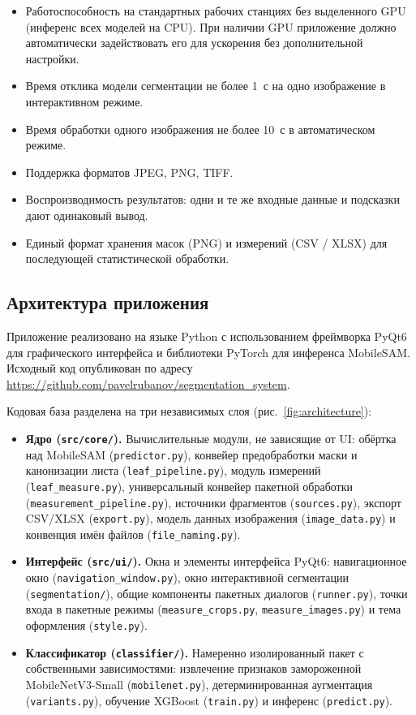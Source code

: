 \begin{itemize}
    \item Работоспособность на стандартных рабочих станциях без выделенного GPU (инференс всех моделей на CPU). При наличии GPU приложение должно автоматически задействовать его для ускорения без дополнительной настройки.
    \item Время отклика модели сегментации не более 1~с на одно изображение в интерактивном режиме.
    \item Время обработки одного изображения не более 10~с в автоматическом режиме.
    \item Поддержка форматов JPEG, PNG, TIFF.
    \item Воспроизводимость результатов: одни и те же входные данные и подсказки дают одинаковый вывод.
    \item Единый формат хранения масок (PNG) и измерений (CSV / XLSX) для последующей статистической обработки.
\end{itemize}

\subsection{Архитектура приложения}
\label{sec:architecture}

Приложение реализовано на языке Python с использованием фреймворка PyQt6 для графического
интерфейса и библиотеки PyTorch для инференса MobileSAM. Исходный код опубликован по адресу
\url{https://github.com/pavelrubanov/segmentation_system}.

Кодовая база разделена на три независимых слоя (рис.~\ref{fig:architecture}):

\begin{itemize}
    \item \textbf{Ядро (\texttt{src/core/}).} Вычислительные модули, не зависящие от UI:
          обёртка над MobileSAM (\texttt{predictor.py}), конвейер предобработки маски
          и канонизации листа (\texttt{leaf\_pipeline.py}), модуль измерений
          (\texttt{leaf\_measure.py}), универсальный конвейер пакетной обработки
          (\texttt{measurement\_pipeline.py}), источники фрагментов (\texttt{sources.py}),
          экспорт CSV/XLSX (\texttt{export.py}), модель данных изображения
          (\texttt{image\_data.py}) и конвенция имён файлов (\texttt{file\_naming.py}).
    \item \textbf{Интерфейс (\texttt{src/ui/}).} Окна и элементы интерфейса PyQt6: навигационное окно
          (\texttt{navigation\_window.py}), окно интерактивной сегментации
          (\texttt{segmentation/}), общие компоненты пакетных диалогов (\texttt{runner.py}),
          точки входа в пакетные режимы (\texttt{measure\_crops.py},
          \texttt{measure\_images.py}) и тема оформления (\texttt{style.py}).
    \item \textbf{Классификатор (\texttt{classifier/}).} Намеренно изолированный пакет
          с собственными зависимостями: извлечение признаков замороженной MobileNetV3-Small
          (\texttt{mobilenet.py}), детерминированная аугментация (\texttt{variants.py}),
          обучение XGBoost (\texttt{train.py}) и инференс (\texttt{predict.py}).
\end{itemize}

